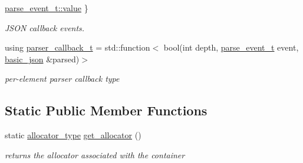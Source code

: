 \begin{DoxyCompactItemize}
\hyperlink{a00025_aea1c863b719b4ca5b77188c171bbfafea2063c1608d6e0baf80249c42e2be5804}{parse\+\_\+event\+\_\+t\+::value}
 \}\begin{DoxyCompactList}\small\item\em J\+S\+ON callback events. \end{DoxyCompactList}
\item 
using \hyperlink{a00025_a9e35475e2027520a78e09f460dbe048a}{parser\+\_\+callback\+\_\+t} = std\+::function$<$ bool(int depth, \hyperlink{a00025_aea1c863b719b4ca5b77188c171bbfafe}{parse\+\_\+event\+\_\+t} event, \hyperlink{a00025}{basic\+\_\+json} \&parsed)$>$
\begin{DoxyCompactList}\small\item\em per-\/element parser callback type \end{DoxyCompactList}\end{DoxyCompactItemize}
\subsection*{Static Public Member Functions}
\begin{DoxyCompactItemize}
\item 
static \hyperlink{a00025_aa44ce84b9ac506b905b8fb56c9a0989d}{allocator\+\_\+type} \hyperlink{a00025_a1a446a48beed4ea564addfd12d235793}{get\+\_\+allocator} ()\hypertarget{a00025_a1a446a48beed4ea564addfd12d235793}{}\label{a00025_a1a446a48beed4ea564addfd12d235793}

\begin{DoxyCompactList}\small\item\em returns the allocator associated with the container \end{DoxyCompactList}\end{DoxyCompactItemize}
